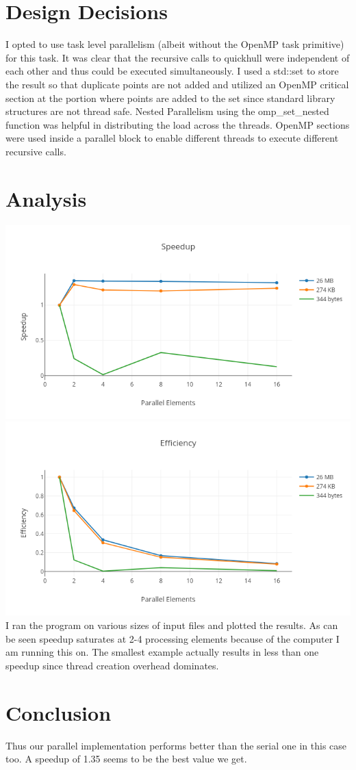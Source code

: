 \documentclass[12pt,a4paper]{article}
\begin{document}
\section{Design Decisions}
I opted to use task level parallelism (albeit without the OpenMP task primitive) for this task. It was clear that the recursive calls to quickhull were independent of each other and thus could be executed simultaneously. I used a std::set to store the result so that duplicate points are not added and utilized an OpenMP critical section at the portion where points are added to the set since standard library structures are not thread safe. Nested Parallelism using the omp\_set\_nested function was helpful in distributing the load across the threads. OpenMP sections were used inside a parallel block to enable different threads to execute different recursive calls.
\section{Analysis}
\includegraphics[scale=0.52]{spd2}\\
\includegraphics[scale=0.52]{eff2}
I ran the program on various sizes of input files and plotted the results. As can be seen speedup saturates at 2-4 processing elements because of the computer I am running this on. The smallest example actually results in less than one speedup since thread creation overhead dominates.\section{Conclusion}
Thus our parallel implementation performs better than the serial one in this case too. A speedup of 1.35 seems to be the best value we get.
\end{document}
